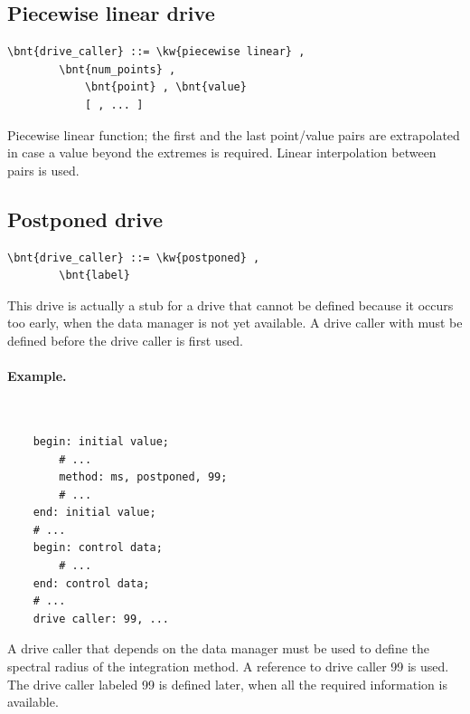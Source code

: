 \subsection{Piecewise linear drive}
\begin{Verbatim}[commandchars=\\\{\}]
    \bnt{drive_caller} ::= \kw{piecewise linear} ,
        \bnt{num_points} ,
            \bnt{point} , \bnt{value} 
            [ , ... ]
\end{Verbatim}
Piecewise linear function; the first and the last point/value pairs are
extrapolated in case a value beyond the extremes is required.
Linear interpolation between pairs is used.

\subsection{Postponed drive}
\begin{Verbatim}[commandchars=\\\{\}]
    \bnt{drive_caller} ::= \kw{postponed} ,
        \bnt{label}
\end{Verbatim}
This drive is actually a stub for a drive that cannot be defined
because it occurs too early, when the data manager is not yet available.
A drive caller with  must be defined before the drive caller
is first used.

\paragraph{Example.} \
\begin{verbatim}
    begin: initial value;
        # ...
        method: ms, postponed, 99;
        # ...
    end: initial value;
    # ...
    begin: control data;
        # ...
    end: control data;
    # ...
    drive caller: 99, ...
\end{verbatim}
A drive caller that depends on the data manager must be used to define
the spectral radius of the integration method.
A reference to drive caller 99 is used.
The drive caller labeled 99 is defined later,
when all the required information is available.


